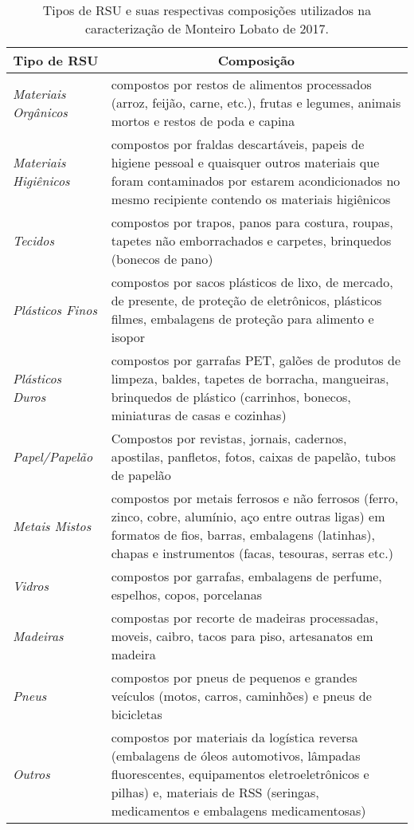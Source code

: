 \begin{table}[htbp]
\caption{Tipos de RSU e suas respectivas composições utilizados na caracterização de Monteiro Lobato de 2017.}
\begin{center}
\begin{tabular}{|l|l|}
\hline
\multicolumn{1}{|c|}{\textbf{Tipo de RSU}} & \multicolumn{1}{c|}{\textbf{Composição}} \\ \hline
\textit{Materiais Orgânicos} & compostos por restos de alimentos processados (arroz, feijão, carne, etc.), frutas e legumes, animais mortos e restos de poda e capina \\ \hline
\textit{Materiais Higiênicos} & compostos por fraldas descartáveis, papeis de higiene pessoal e quaisquer outros materiais que foram contaminados por estarem acondicionados no mesmo recipiente contendo os materiais higiênicos \\ \hline
\textit{Tecidos} & compostos por trapos, panos para costura, roupas, tapetes não emborrachados e carpetes, brinquedos (bonecos de pano) \\ \hline
\textit{Plásticos Finos} & compostos por sacos plásticos de lixo, de mercado, de presente, de proteção de eletrônicos, plásticos filmes, embalagens de proteção para alimento e isopor \\ \hline
\textit{Plásticos Duros} & compostos por garrafas PET, galões de produtos de limpeza, baldes, tapetes de borracha, mangueiras, brinquedos de plástico (carrinhos, bonecos, miniaturas de casas e cozinhas) \\ \hline
\textit{Papel/Papelão} & Compostos por revistas, jornais, cadernos, apostilas, panfletos, fotos, caixas de papelão, tubos de papelão
 \\ \hline
\textit{Metais Mistos} & compostos por metais ferrosos e não ferrosos (ferro, zinco, cobre, alumínio, aço entre outras ligas) em formatos de fios, barras, embalagens (latinhas), chapas e instrumentos (facas, tesouras, serras etc.) \\ \hline
\textit{Vidros} & compostos por garrafas, embalagens de perfume, espelhos, copos, porcelanas \\ \hline
\textit{Madeiras} & compostas por recorte de madeiras processadas, moveis, caibro, tacos para piso, artesanatos em madeira \\ \hline
\textit{Pneus} & compostos por pneus de pequenos e grandes veículos (motos, carros, caminhões) e pneus de bicicletas \\ \hline
\textit{Outros} & compostos por materiais da logística reversa (embalagens de óleos automotivos, lâmpadas fluorescentes, equipamentos eletroeletrônicos e pilhas) e, materiais de RSS (seringas, medicamentos e embalagens medicamentosas) \\ \hline
\end{tabular}
\end{center}
\label{tab:tipos_rsu}
\end{table}
